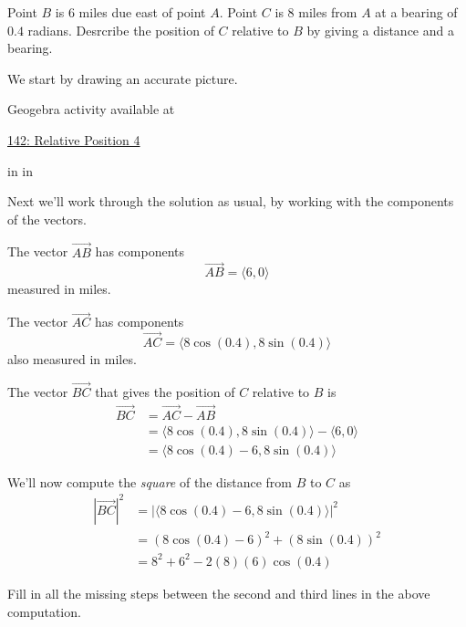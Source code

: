 \documentclass{ximera}
\newcommand{\pskip}{\vskip 0.1 in}
\begin{document}
 \begin{example}  \label{Exergt43tgr}
Point $B$ is $6$ miles due east of point $A$. Point $C$ is $8$ miles from $A$ at a bearing of $0.4$ radians. Desrcribe the position of $C$ relative to $B$ by giving a distance and a bearing.

\begin{explanation}
We start by drawing an accurate picture.

 
\begin{onlineOnly}
    \begin{center}
\end{center}
\end{onlineOnly}


Geogebra activity available at

\href{https://www.geogebra.org/classic/kjnatcwc}{142: Relative Position 4}


\pskip \pskip

Next we'll work through the solution as usual, by working with the components of the vectors.

The vector $\overrightarrow{AB}$ has components
\[
   \overrightarrow{AB} = \langle 6, 0  \rangle
\]
measured in miles.

The vector $\overrightarrow{AC}$ has components
\[
    \overrightarrow{AC} = \langle 8 \cos (0.4), 8 \sin(0.4)  \rangle
\]
also measured in miles.

The vector $\overrightarrow{BC}$ that gives the position of $C$ relative to $B$ is
\begin{align*}
       \overrightarrow{BC} &= \overrightarrow{AC} - \overrightarrow{AB}    \\
                                    &= \langle 8 \cos (0.4), 8 \sin(0.4)  \rangle - \langle 6, 0  \rangle \\
                                    &= \langle 8 \cos (0.4) - 6, 8 \sin(0.4)  \rangle
\end{align*}

We'll now compute the \emph{square} of the distance from $B$ to $C$ as
\begin{align*}
         |  \overrightarrow{BC} |^2 &= |    \langle 8 \cos (0.4) - 6, 8 \sin(0.4)  \rangle    |^2  \\
                                             &= (8 \cos (0.4) - 6)^2 + (8 \sin(0.4))^2   \\
                                             &=  8^2 + 6^2 - 2(8)(6) \cos(0.4)
\end{align*}

\begin{question}  \label{Q4r345fg}
Fill in all the missing steps between the second and third lines in the above computation. 
\end{question}

\end{explanation}

\end{example}
\end{document}

